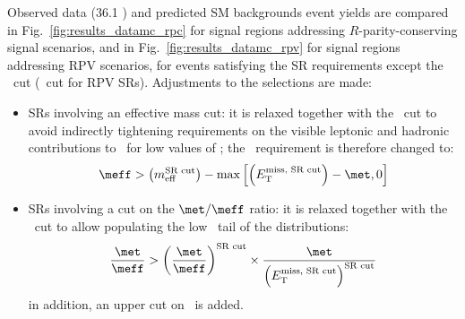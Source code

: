 
Observed data (36.1 \ifb) and predicted SM backgrounds event yields 
are compared in Fig.~\ref{fig:results_datamc_rpc} for signal regions addressing $R$-parity-conserving signal scenarios, 
and in Fig.~\ref{fig:results_datamc_rpv} for signal regions addressing RPV scenarios, 
for events satisfying the SR requirements except the \met\ cut (\meff\ cut for RPV SRs). Adjustments to the selections are made: 
\begin{itemize}
\item SRs involving an effective mass cut: it is relaxed 
together with the \met\ cut to avoid indirectly tightening requirements 
on the visible leptonic and hadronic contributions to \meff\ for low values of \met; 
the \meff\ requirement is therefore changed to:
$$
\meff > \left(m_\mathrm{eff}^\text{SR cut}\right) - \operatorname{max}\left[\left(E_\mathrm{T}^\text{miss, SR cut}\right)-\met,0\right]
$$
\item SRs involving a cut on the $\met/\meff$ ratio: it is relaxed together with the \met\ cut 
to allow populating the low \met\ tail of the distributions: 
$$
\frac{\met}{\meff} > \left(\frac{\met}{\meff}\right)^\text{SR cut}\times \frac{\met}{\left(E_\mathrm{T}^\text{miss, SR cut}\right)^\text{SR cut}}
$$
in addition, an upper cut on \meff\ is added. 
\end{itemize}

